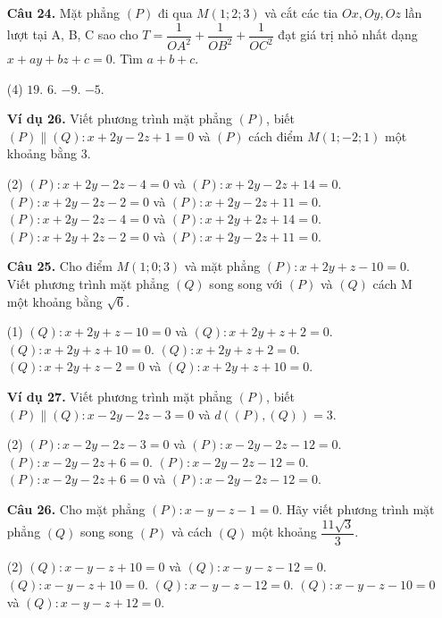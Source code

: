 \documentclass[12pt, a4paper]{article}
\begin{document}
\begin{enumerate}[label=\textbf{\arabic*.}, wide=0pt, leftmargin=*]
    \item[\textbf{Câu 24.}] Mặt phẳng \((P)\) đi qua \(M(1;2;3)\) và cắt các tia \(Ox, Oy, Oz\) lần lượt tại A, B, C sao cho \(T = \dfrac{1}{OA^2} + \dfrac{1}{OB^2} + \dfrac{1}{OC^2}\) đạt giá trị nhỏ nhất dạng \(x+ay+bz+c=0\). Tìm \(a+b+c\).
    \begin{tasks}(4)
        \task \(19\).
        \task \(6\).
        \task \(-9\).
        \task \(-5\).
    \end{tasks}
    
    \item[\textbf{Ví dụ 26.}] Viết phương trình mặt phẳng \((P)\), biết \((P) \parallel (Q): x+2y-2z+1=0\) và \((P)\) cách điểm \(M(1;-2;1)\) một khoảng bằng 3.
    \begin{tasks}(2)
        \task \((P): x+2y-2z-4=0\) và \((P): x+2y-2z+14=0\).
        \task \((P): x+2y-2z-2=0\) và \((P): x+2y-2z+11=0\).
        \task \((P): x+2y-2z-4=0\) và \((P): x+2y+2z+14=0\).
        \task \((P): x+2y+2z-2=0\) và \((P): x+2y-2z+11=0\).
    \end{tasks}
    

    \item[\textbf{Câu 25.}] Cho điểm \(M(1;0;3)\) và mặt phẳng \((P) : x+2y+z-10=0\). Viết phương trình mặt phẳng \((Q)\) song song với \((P)\) và \((Q)\) cách M một khoảng bằng \(\sqrt{6}\).
    \begin{tasks}[label-width=1em](1)
        \task \((Q): x+2y+z-10=0\) và \((Q): x+2y+z+2=0\).
        \task \((Q): x+2y+z+10=0\).
        \task \((Q): x+2y+z+2=0\).
        \task \((Q): x+2y+z-2=0\) và \((Q): x+2y+z+10=0\).
    \end{tasks}
    
    \item[\textbf{Ví dụ 27.}] Viết phương trình mặt phẳng \((P)\), biết \((P)\parallel(Q) : x-2y-2z-3=0\) và \(d((P),(Q))=3\).
    \begin{tasks}(2)
        \task \((P): x-2y-2z-3=0\) và \((P): x-2y-2z-12=0\).
        \task \((P): x-2y-2z+6=0\).
        \task \((P): x-2y-2z-12=0\).
        \task \((P): x-2y-2z+6=0\) và \((P): x-2y-2z-12=0\).
    \end{tasks}
    
    \item[\textbf{Câu 26.}] Cho mặt phẳng \((P) : x-y-z-1=0\). Hãy viết phương trình mặt phẳng \((Q)\) song song \((P)\) và cách \((Q)\) một khoảng \(\dfrac{11\sqrt{3}}{3}\).
    \begin{tasks}(2)
        \task \((Q): x-y-z+10=0\) và \((Q): x-y-z-12=0\).
        \task \((Q): x-y-z+10=0\).
        \task \((Q): x-y-z-12=0\).
        \task \((Q): x-y-z-10=0\) và \((Q): x-y-z+12=0\).
    \end{tasks}


\end{enumerate}
\end{document}
